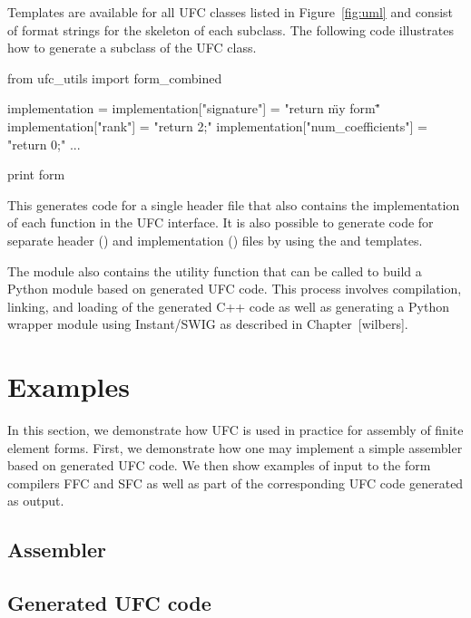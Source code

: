 Templates are available for all UFC classes listed in
Figure~\ref{fig:uml} and consist of format strings for the skeleton of
each subclass. The following code illustrates how to generate a
subclass of the UFC  class.

{\scriptsize
\begin{code}
from ufc_utils import form_combined

implementation = {}
implementation["signature"] = "return \"my form\""
implementation["rank"] = "return 2;"
implementation["num_coefficients"] = "return 0;"
...

print form %
\end{code}
}

This generates code for a single header file that also contains the
implementation of each function in the UFC  interface. It is
also possible to generate code for separate header () and
implementation () files by using the  and
 templates.

The  module also contains the utility function
 that can be called to build a Python module
based on generated UFC code. This process involves compilation,
linking, and loading of the generated C++ code as well as generating a
Python wrapper module using Instant/SWIG as described in
Chapter~[wilbers].

\section{Examples}
\label{sec:examples}

In this section, we demonstrate how UFC is used in practice for
assembly of finite element forms. First, we demonstrate how one may
implement a simple assembler based on generated UFC code. We then show
examples of input to the form compilers FFC and SFC as well as part of
the corresponding UFC code generated as output.

\subsection{Assembler}



\subsection{Generated UFC code}

